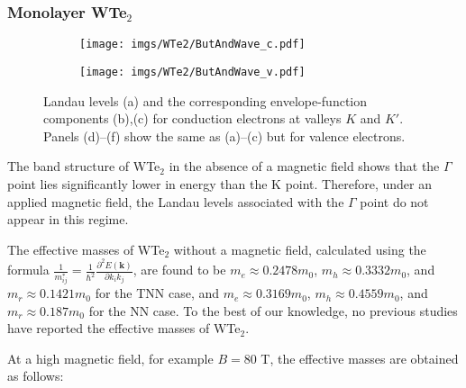 \documentclass{article}
\begin{document}
\subsubsection*{Monolayer WTe$_{2}$}
\begin{figure}[htb]
	\begin{subfigure}{0.495\textwidth}
		\centering
		\texttt{[image: imgs/WTe2/ButAndWave\_c.pdf]}
	\end{subfigure}
	\begin{subfigure}{0.495\textwidth}
		\centering
		\texttt{[image: imgs/WTe2/ButAndWave\_v.pdf]}
	\end{subfigure}
	\caption{Landau levels (a) and the corresponding envelope-function components (b),(c) for conduction electrons at valleys $K$ and $K'$. Panels (d)–(f) show the same as (a)–(c) but for valence electrons.}
\end{figure}

The band structure of WTe$_{2}$ in the absence of a magnetic field shows that the $\Gamma$ point lies significantly lower in energy than the K point. Therefore, under an applied magnetic field, the Landau levels associated with the $\Gamma$ point do not appear in this regime.  

The effective masses of WTe$_{2}$ without a magnetic field, calculated using the formula $\frac{1}{m_{ij}^*} = \frac{1}{\hbar^{2}} \frac{\partial^{2}E(\mathbf{k})}{\partial k_{i} k_{j}}$, are found to be $m_{e} \approx 0.2478 m_{0}$, $m_{h} \approx 0.3332 m_{0}$, and $m_{r} \approx 0.1421 m_{0}$ for the TNN case, and $m_{e} \approx 0.3169 m_{0}$, $m_{h} \approx 0.4559 m_{0}$, and $m_{r} \approx 0.187 m_{0}$ for the NN case. To the best of our knowledge, no previous studies have reported the effective masses of WTe$_{2}$.  

At a high magnetic field, for example $B = 80$ T, the effective masses are obtained as follows:  
\end{document}
